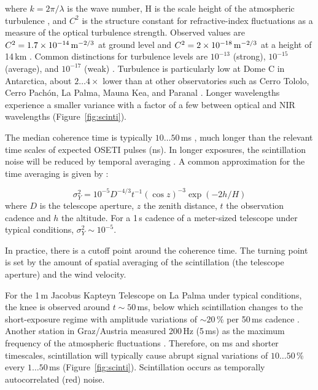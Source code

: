 \documentclass[twocolumn,tighten,longauthor]{myaastex62}
\begin{document}
where $k = 2 \pi / \lambda$ is the wave number, H is the scale height of the atmospheric turbulence \citep[generally taken as $H\sim8{,}000\,$m,][]{2015MNRAS.452.1707O}, and $C^2$ is the structure constant for refractive-index fluctuations as a measure of the optical turbulence strength. Observed values are $C^2=1.7\times10^{-14}\,{\rm m}^{-2/3}$ at ground level and $C^2=2\times10^{-18}\,{\rm m}^{-2/3}$ at a height of 14\,km \citep{Coulman1988,Kopeika2001,Zilberman2001}. Common distinctions for turbulence levels are $10^{-13}$ (strong), $10^{-15}$ (average), and $10^{-17}$ (weak) \citep{goodman1985statistical,XiaomingZhu2002}. Turbulence is particularly low at Dome C in Antarctica, about $2 \dots 4 \times$ lower than at other observatories such as Cerro Tololo, Cerro Pach\'{o}n, La Palma, Mauna Kea, and Paranal \citep{2006PASP..118..924K,2015MNRAS.452.1707O}. Longer wavelengths experience a smaller variance with a factor of a few between optical and NIR wavelengths (Figure~\ref{fig:scinti}).

The median coherence time is typically $10 \dots 50\,$ms \citep{2006PASP..118..924K}, much longer than the relevant time scales of expected OSETI pulses (ns). In longer exposures, the scintillation noise will be reduced by temporal averaging \citep[for details, see][]{2015MNRAS.452.1707O}. A common approximation for the time averaging is given by \citet{1967AJ.....72..747Y}:

\begin{equation}
\sigma_{Y}^2 = 10^{-5}D^{-4/3}t^{-1}(\cos z)^{-3} \exp{\left(-2h/H\right)}
\end{equation}
where $D$ is the telescope aperture,
$z$ the zenith distance,
$t$ the observation cadence and
$h$ the altitude. For a 1\,s cadence of a meter-sized telescope under typical conditions, $\sigma_{Y}^2\sim10^{-5}$.

In practice, there is a cutoff point around the coherence time. The turning point is set by the amount of spatial averaging of the scintillation (the telescope aperture) and the wind velocity.

For the 1\,m Jacobus Kapteyn Telescope on La Palma under typical conditions, the knee is observed around $t\sim50\,$ms, below which scintillation changes to the short-exposure regime with amplitude variations of $\sim20\,$\% per 50\,ms cadence \citep{2015MNRAS.452.1707O}. Another station in Graz/Austria measured 200\,Hz (5\,ms) as the maximum frequency of the atmospheric fluctuations \citep{Prochazka2004,Kral2006}. Therefore, on ms and shorter timescales, scintillation will typically cause abrupt signal variations of $10\dots50\,$\% every $1\dots50$\,ms (Figure~\ref{fig:scinti}). Scintillation occurs as temporally autocorrelated (red) noise.
\end{document}
